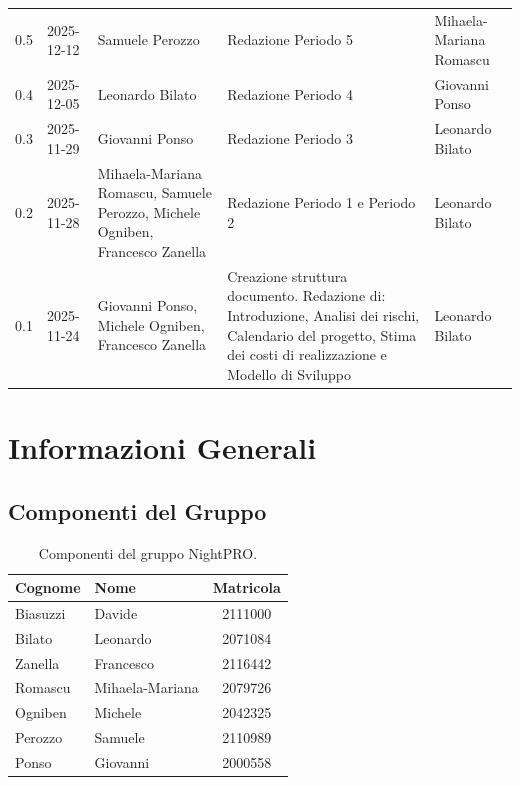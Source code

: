 \documentclass[a4paper, 11pt, oneside]{scrartcl} %
\begin{document}
{\begin{longtable}{@{}llp{}p{}p{}@{}}
0.5 & 2025-12-12 & Samuele Perozzo & Redazione Periodo 5 & Mihaela-Mariana Romascu \\
0.4 & 2025-12-05 & Leonardo Bilato & Redazione Periodo 4 & Giovanni Ponso \\
0.3 & 2025-11-29 & Giovanni Ponso & Redazione Periodo 3 & Leonardo Bilato \\
0.2 & 2025-11-28 & Mihaela-Mariana Romascu, Samuele Perozzo, Michele Ogniben, Francesco Zanella & Redazione Periodo 1 e Periodo 2 & Leonardo Bilato \\
0.1 & 2025-11-24 & Giovanni Ponso, Michele Ogniben, Francesco Zanella & Creazione struttura documento. Redazione di: Introduzione, Analisi dei rischi, Calendario del progetto, Stima dei costi di realizzazione e Modello di Sviluppo & Leonardo Bilato \\
\end{longtable}
}
\newpage
\tableofcontents 
\pagestyle{fancy} 

\newpage
\section*{Informazioni Generali}

\subsection*{Componenti del Gruppo}

\begin{table}[h!]
\centering
\renewcommand{\arraystretch}{1.2} 
\begin{tabular}{@{}llc@{}}
\toprule
\textbf{Cognome} & \textbf{Nome} & \textbf{Matricola} \\
\midrule
Biasuzzi & Davide & 2111000 \\
Bilato & Leonardo & 2071084 \\
Zanella & Francesco & 2116442 \\
Romascu & Mihaela-Mariana & 2079726 \\
Ogniben & Michele & 2042325 \\
Perozzo & Samuele & 2110989 \\
Ponso & Giovanni & 2000558 \\
\bottomrule
\end{tabular}
\caption{Componenti del gruppo NightPRO.}
\label{tab_fig_componenti_del_gruppo_nightpro}
\end{table}
\end{document}
